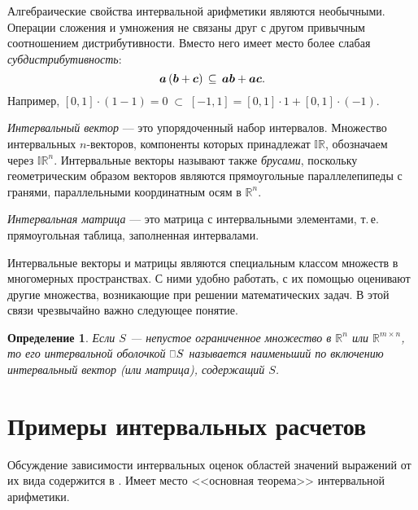 \documentclass[a5paper,openany]{book}
\newcommand{\mbf}[1]{\protect\text{\boldmath$#1$}}
\newcommand{\mbb}{\mathbb}
\newcommand{\ih}{\scalebox{0.67}[0.87]{$\Box$\hspace*{1pt}}}
\newtheorem{definition}{Определение}[section]
\begin{document}
{{Алгебраические свойства интервальной арифметики
являются необычными. 
Операции сложения и умножения не связаны друг с другом привычным соотношением 
дистрибутивности. Вместо него имеет место более слабая \textit{субдистрибутивность}: 
\begin{equation*} 
	\index{субдистрибутивность} 
	\mbf{a}\,(\mbf{b} + \mbf{c}) \,\subseteq\, \mbf{a}\mbf{b} + \mbf{a}\mbf{c}. 
\end{equation*} 
Например, $[0, 1] \cdot (1 - 1) = 0 \;\subset\; [-1, 1] = [0, 1]\cdot 1 + [0, 1]\cdot(-1)$. 

\emph{Интервальный вектор} --- это упорядоченный набор интервалов. 
Множество интервальных $n$-векторов, 
компоненты которых принадлежат $\mbb{IR}$, обозначаем через $\mbb{IR}^n$. 
Интервальные векторы называют также \textit{брусами}, поскольку геометрическим 
образом векторов являются прямоугольные параллелепипеды с гранями, параллельными координатным 
осям в $\mbb{R}^n$. 

\emph{Интервальная матрица} --- это матрица с интервальными элементами, т.\,е. прямоугольная 
таблица, заполненная интервалами. 

Интервальные векторы и матрицы являются специальным классом 
множеств в многомерных пространствах. С ними  удобно работать, с их 
помощью оценивают другие множества, возникающие при решении математических задач. 
В этой связи чрезвычайно важно следующее понятие. 
\begin{definition}
	Если $S$ --- непустое ограниченное множество в $\mbb{R}^n$ или $\mbb{R}^{m\times n}$, 
	то его \textsl{интервальной оболочкой} $\ih S$ называется наименьший по включению 
	интервальный вектор (или матрица), содержащий $S$. 
\end{definition}

\section{Примеры интервальных расчетов} 


Обсуждение зависимости интервальных оценок областей значений выражений от их вида 
содержится в \cite{SSharyBook}.  Имеет место <<основная теорема>> интервальной арифметики.

}}
\end{document}
